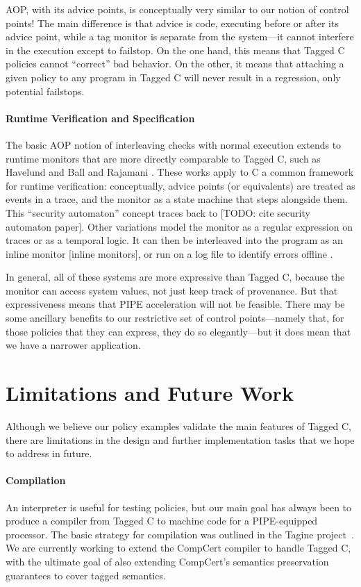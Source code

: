 \documentclass{llncs}
\begin{document}
AOP, with its advice points, is conceptually very similar to our notion of control points!
The main difference is that advice is
code, executing before or after its advice point, while a tag monitor is separate from
the system---it cannot interfere in the execution except to failstop. On the one hand,
this means that Tagged C policies cannot ``correct'' bad behavior. On the other,
it means that attaching a given policy to any program in Tagged C will never result
in a regression, only potential failstops.

\paragraph{Runtime Verification and Specification}

The basic AOP notion of interleaving checks with normal execution extends to
runtime monitors that are more directly comparable to Tagged C, such as
Havelund \cite{Havelund08:RVC} and Ball and Rajamani \cite{Ball02:slic}.
These works apply to C a common framework for runtime verification:
conceptually, advice points (or equivalents) are treated as events in a trace,
and the monitor as a state machine that steps alongside them. This ``security automaton''
concept traces back to [TODO: cite security automaton paper].
Other variations model the monitor as a regular expression on traces or
as a temporal logic. It can then be interleaved into the program as
an inline monitor \cite{} [inline monitors], or run on a log file to identify
errors offline \cite{}.

In general, all of these systems are more expressive than Tagged C, because the
monitor can access system values, not just keep track of provenance. But that expressiveness
means that PIPE acceleration will not be feasible. There may be some ancillary
benefits to our restrictive set of control points---namely that, for those policies
that they can express, they do so elegantly---but it does mean that we have a narrower
application.

\section{Limitations and Future Work}
\label{sec:limitations}
\label{sec:futurework}

Although we believe our policy examples validate the main features of Tagged C, 
there are limitations in the design and further implementation tasks that we
hope to address in future.

\paragraph*{Compilation}
An interpreter is useful for testing policies, but our main goal has always been to
produce a compiler from Tagged C to machine code for a PIPE-equipped processor.
The basic strategy for compilation was outlined in the Tagine project~\cite{Chhak21:Tagine}.
We are currently working to extend the CompCert compiler to handle Tagged C, with the ultimate
goal of also extending CompCert's semantics preservation guarantees to cover tagged semantics.
\end{document}
